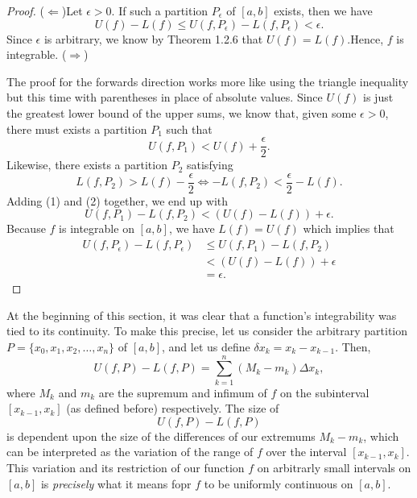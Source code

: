 \begin{proof}
	(\( \Leftarrow \))Let \( \epsilon > 0  \). If such a partition \( P_{\epsilon } \) of \( [a,b]  \) exists, then we have
	\[ U(f) - L(f) \leq U(f, P_{\epsilon }) - L(f, P_{\epsilon }) < \epsilon. \]
	Since \( \epsilon  \) is arbitrary, we know by Theorem 1.2.6 that \( U(f) = L(f) \).Hence, \( f  \) is integrable.  
	(\( \Rightarrow \)) 

	The proof for the forwards direction works more like using the triangle inequality but this time with parentheses in place of absolute values. Since \( U(f)  \) is just the greatest lower bound of the upper sums, we know that, given some \( \epsilon > 0  \), there must exists a partition \( P_{1} \) such that 
	\[  U(f, P_{1}) < U(f) + \frac{ \epsilon  }{ 2 }. \tag{1} \]
	Likewise, there exists a partition \( P_{2}  \) satisfying 
	\[  L(f, P_{2}) > L(f) - \frac{ \epsilon  }{ 2 } \iff -L(f, P_{2}  ) < \frac{ \epsilon  }{ 2 } - L(f). \tag{2} \]
	Adding (1) and (2) together, we end up with 
	\[  U(f, P_{1}) - L(f, P_{2}) < ( U(f) - L(f)) + \epsilon.  \]
	Because \( f  \) is integrable on \( [a,b]  \), we have \( L(f) = U(f)  \) which implies that 
	\begin{align*}
	    U(f, P_{\epsilon }) - L(f, P_{\epsilon}) &\leq  U(f, P_{1}) - L(f, P_{2})  \\
												 &< (U(f) - L(f)) + \epsilon \\
												 &= \epsilon.
	\end{align*}
\end{proof}

At the beginning of this section, it was clear that a function's integrability was tied to its continuity. To make this precise, let us consider the arbitrary partition \( P = \{ x_{0}, x_{1}, x_{2}, \dots, x_{n} \}  \) of \( [a,b]  \), and let us define \( \delta x_{k } = x_{k } - x_{k-1 } \). Then, 
\[  U(f,P) - L(f,P) = \sum_{ k=1 }^{ n } (M_{k } - m_{k } ) \Delta x_{ k }, \]
where \( M _{k }  \) and \( m_{ k }  \) are the supremum and infimum of \( f  \) on the subinterval \( [x_{k -1 } , x_{ k  }] \) (as defined before) respectively. The size of 
\[  U(f,P) - L(f,P)   \] is dependent upon the size of the differences of our extremums \(  M_{k } - m_{k } \), which can be interpreted as the variation of the range of \( f  \) over the interval \( [x_{k-1 }, x_{k }] \). This variation and its restriction of our function \( f  \) on arbitrarly small intervals on \( [a,b]  \) is \textit{precisely} what it means fopr \( f  \) to be uniformly continuous on \( [a,b] \).

